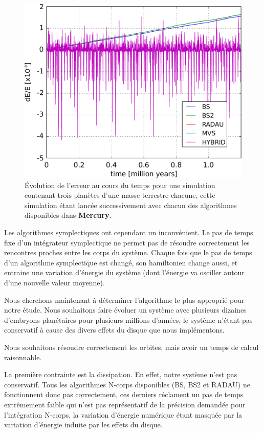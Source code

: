 \begin{figure}[htbp]
\centering
\includegraphics[width=0.65\linewidth]{figure/energy_error.pdf}
\caption[Pour une même simulation, erreur au cours du temps pour BS, BS2, RADAU, MVS et HYBRID.]{Évolution de l'erreur au cours
du temps pour une simulation contenant trois planètes d'une masse terrestre chacune, cette simulation étant lancée
successivement avec chacun des algorithmes disponibles dans \textbf{Mercury}.}\label{fig:energy_error}
\end{figure}

Les algorithmes symplectiques ont cependant un inconvénient. Le pas de temps fixe d'un intégrateur symplectique ne permet pas de résoudre correctement les rencontres proches entre les corps du système. Chaque fois que le pas de temps d'un algorithme symplectique est changé, son hamiltonien change aussi, et entraine une variation d'énergie du système (dont l'énergie va osciller autour d'une nouvelle valeur moyenne). 

\bigskip

Nous cherchons maintenant à déterminer l'algorithme le plus approprié pour notre étude. Nous souhaitons faire évoluer un système avec plusieurs dizaines d'embryons planétaires pour plusieurs millions d'années, le système n'étant pas conservatif à cause des divers effets du disque que nous implémentons. 

Nous souhaitons résoudre correctement les orbites, mais avoir un temps de calcul raisonnable. 

La première contrainte est la dissipation. En effet, notre système n'est pas conservatif. Tous les algorithmes N-corps disponibles (BS, BS2 et RADAU) ne fonctionnent donc pas correctement, ces derniers réclament un pas de temps extrêmement faible qui n'est pas représentatif de la précision demandée pour l'intégration N-corps, la variation d'énergie numérique étant masquée par la variation d'énergie induite par les effets du disque. 


